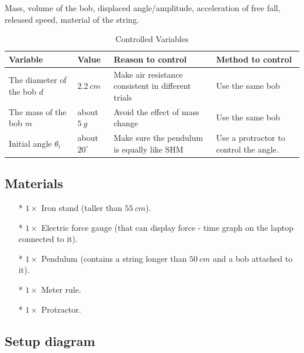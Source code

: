 \documentclass[a4paper]{article}
\newcommand{\grayrow}{\rowcolor[gray]{0.925}}
\begin{document}
\begin{tcolorbox}[title = Note]
    Mass, volume of the bob, displaced angle/amplitude, acceleration of free fall, released speed, material of the string.
\end{tcolorbox}

\begin{table}[ht]
    \centering
    \caption{Controlled Variables}
    \label{tab.ctrlvar}
    \vspace{0.2cm}
    \begin{tabularx}{\textwidth}{p{2.0cm} p{1.5cm} X X} %
        \hline \hline
        \textbf{Variable} & \textbf{Value} & \textbf{Reason to control} & \textbf{Method to control} \\ \hline
        \grayrow The diameter of the bob $d$ & $\SI{2.2}{cm}$ & Make air resistance consistent in different trials & Use the same bob \\ 
        The mass of the bob $m$ & about $\SI{5}{g}$ & Avoid the effect of mass change & Use the same bob \\ 
        \grayrow Initial angle $\theta_i$ & about $20^\circ$ & Make sure the pendulum is equally like SHM & Use a protractor to control the angle. \\ \hline
    \end{tabularx}
\end{table}

\subsection{Materials}

\begin{itemize}
    \item[*] $1 \times$ Iron stand (taller than $\SI{55}{cm}$).
    \item[*] $1 \times$ Electric force gauge (that can display force - time graph on the laptop connected to it).
    \item[*] $1 \times$ Pendulum (contains a string longer than $\SI{50}{cm}$ and a bob attached to it).
    \item[*] $1 \times$ Meter rule.
    \item[*] $1 \times$ Protractor.
\end{itemize}

\subsection{Setup diagram}
\end{document}
